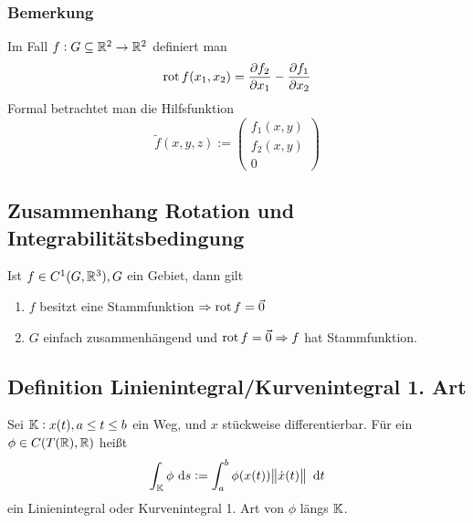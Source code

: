 \subsubsection{Bemerkung}
Im Fall $f: G \subseteq \mathbb{R}^2 \rightarrow \mathbb{R}^2$ definiert man
\begin{equation*}
    \operatorname{rot} f(x_1, x_2) = \frac{\partial f_2}{\partial x_1} - \frac{\partial f_1}{\partial x_2}
\end{equation*}
Formal betrachtet man die Hilfsfunktion
\begin{equation*}
    \tilde{f}(x,y,z) :=
    \begin{pmatrix}
        f_1(x,y)\\
        f_2(x,y)\\
        0
    \end{pmatrix}
\end{equation*}

\subsection{Zusammenhang Rotation und Integrabilitätsbedingung}
Ist $f \in C^1(G, \mathbb{R}^3), G$ ein Gebiet, dann gilt
\begin{enumerate}[label= (\alph*)]
    \item $f$ besitzt eine Stammfunktion $\Rightarrow \operatorname{rot} f = \vec{0}$
    \item $G$ einfach zusammenhängend und $\operatorname{rot} f = \vec{0} \Rightarrow f$
        hat Stammfunktion.
\end{enumerate}

\subsection{Definition Linienintegral/Kurvenintegral 1. Art}
Sei $\mathbb{K}: x(t), a \leq t \leq b$ ein Weg, und $x$ stückweise differentierbar.
Für ein $\phi \in  C(T(\mathbb{R}), \mathbb{R})$ heißt
\begin{equation*}
    \int_{\mathbb{K}} \phi \text{ d}s := \int_a^b \phi(x(t)) \norm{ \dot{x}(t)} \text{ d}t
\end{equation*}
ein Linienintegral oder Kurvenintegral 1. Art von $\phi$ längs $\mathbb{K}$.

